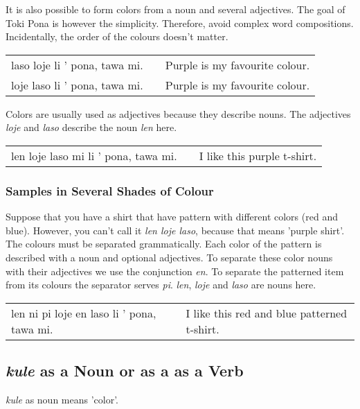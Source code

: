 It is also possible to form colors from a noun and several adjectives. 
The goal of Toki Pona is however the simplicity.
Therefore, avoid complex word compositions.
Incidentally, the order of the colours doesn't matter.

\begin{supertabular}{p{5,5cm}|ll}
laso loje  li ' pona, tawa mi. && Purple is my favourite colour.  \\ %
loje laso  li ' pona, tawa mi. && Purple is my favourite colour.  \\
\end{supertabular}

Colors are usually used as adjectives because they describe nouns. 
The adjectives \textit{loje} and \textit{laso} describe the noun \textit{len} here.

\begin{supertabular}{p{5,5cm}|ll}
len loje laso mi li ' pona, tawa mi. && I like this purple t-shirt. \\
\end{supertabular}

%
%
\subsubsection*{Samples in Several Shades of Colour}
%
%
Suppose that you have a shirt that have pattern with different colors (red and blue). 
However, you can't call it \textit{len loje laso}, because that means 'purple shirt'. 
The colours must be separated grammatically. 
Each color of the pattern is described with a noun and optional adjectives. 
To separate these color nouns with their adjectives we use the conjunction \textit{en}.
To separate the patterned item from its colours the separator serves \textit{pi}.
\textit{len}, \textit{loje} and \textit{laso} are nouns here. 

\begin{supertabular}{p{5,5cm}|ll}
len ni pi loje en laso li ' pona, tawa mi. && I like this red and blue patterned t-shirt. \\
\end{supertabular} 
%
\subsection*{\textit{kule} as a Noun or as a as a Verb}
%
%
\textit{kule} as noun means 'color'. 

